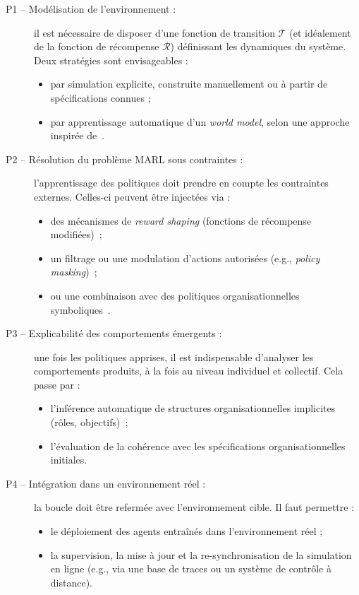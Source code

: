 \begin{description}
    \item[P1 -- Modélisation de l'environnement :] il est nécessaire de disposer d'une fonction de transition \(\mathcal{T}\) (et idéalement de la fonction de récompense \(\mathcal{R}\)) définissant les dynamiques du système. Deux stratégies sont envisageables :
        \begin{itemize}
            \item par simulation explicite, construite manuellement ou à partir de spécifications connues ;
            \item par apprentissage automatique d'un \textit{world model}, selon une approche inspirée de~\cite{Ha2018}.
        \end{itemize}

    \item[P2 -- Résolution du problème \ac{MARL} sous contraintes :] l'apprentissage des politiques doit prendre en compte les contraintes externes. Celles-ci peuvent être injectées via :
        \begin{itemize}
            \item des mécanismes de \textit{reward shaping} (fonctions de récompense modifiées)~\cite{Ng1999};
            \item un filtrage ou une modulation d'actions autorisées (e.g., \textit{policy masking})~\cite{ElsayedAly2021};
            \item ou une combinaison avec des politiques organisationnelles symboliques~\cite{Boella2006,Hubner2004}.
        \end{itemize}

    \item[P3 -- Explicabilité des comportements émergents :] une fois les politiques apprises, il est indispensable d'analyser les comportements produits, à la fois au niveau individuel et collectif. Cela passe par :
        \begin{itemize}
            \item l'inférence automatique de structures organisationnelles implicites (rôles, objectifs)~\cite{Rahwan2003};
            \item l'évaluation de la cohérence avec les spécifications organisationnelles initiales.
        \end{itemize}

    \item[P4 -- Intégration dans un environnement réel :] la boucle doit être refermée avec l'environnement cible. Il faut permettre :
        \begin{itemize}
            \item le déploiement des agents entraînés dans l'environnement réel ;
            \item la supervision, la mise à jour et la re-synchronisation de la simulation en ligne (e.g., via une base de traces ou un système de contrôle à distance).
        \end{itemize}
\end{description}

